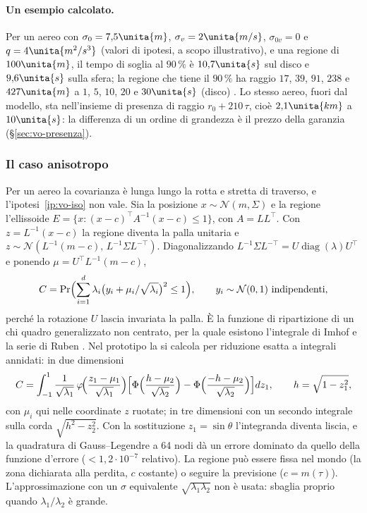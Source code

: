 \paragraph{Un esempio calcolato.} Per un aereo con $\sigma_0=7{,}5\unita{m}$, $\sigma_v=2\unita{m/s}$, $\sigma_{0v}=0$ e $q=4\unita{m^2/s^3}$ (valori di ipotesi, a scopo illustrativo), e una regione di $100\unita{m}$, il tempo di soglia al $90\,\%$ è $10{,}7\unita{s}$ sul disco e $9{,}6\unita{s}$ sulla sfera; la regione che tiene il $90\,\%$ ha raggio $17$, $39$, $91$, $238$ e $427\unita{m}$ a $1$, $5$, $10$, $20$ e $30\unita{s}$ (disco) . Lo stesso aereo, fuori dal modello, sta nell'insieme di presenza di raggio $r_0+210\,\tau$, cioè $2{,}1\unita{km}$ a $10\unita{s}$: la differenza di un ordine di grandezza è il prezzo della garanzia (\S\ref{sec:vo-presenza}).

\subsubsection{Il caso anisotropo}\label{sec:vo-c-aniso}

Per un aereo la covarianza è lunga lungo la rotta e stretta di traverso, e l'ipotesi~\ref{ip:vo-iso} non vale. Sia la posizione $x\sim\mathcal N(m,\Sigma)$ e la regione l'ellissoide $E=\{x:(x-c)^\top A^{-1}(x-c)\le1\}$, con $A=LL^\top$. Con $z=L^{-1}(x-c)$ la regione diventa la palla unitaria e $z\sim\mathcal N(L^{-1}(m-c),\,L^{-1}\Sigma L^{-\top})$. Diagonalizzando $L^{-1}\Sigma L^{-\top}=U\operatorname{diag}(\lambda)U^\top$ e ponendo $\mu=U^\top L^{-1}(m-c)$,
\begin{equation}\label{eq:vo-aniso}
C=\Pr\Bigl(\sum_{i=1}^d\lambda_i\bigl(y_i+\mu_i/\sqrt{\lambda_i}\bigr)^2\le1\Bigr),\qquad y_i\sim\mathcal N(0,1)\ \text{indipendenti},
\end{equation}
perché la rotazione $U$ lascia invariata la palla. È la funzione di ripartizione di un chi quadro generalizzato non centrato, per la quale esistono l'integrale di Imhof \citep{DA_VERIFICARE:imhof1961} e la serie di Ruben \citep{DA_VERIFICARE:ruben1962}. Nel prototipo la si calcola per riduzione esatta a integrali annidati: in due dimensioni
\[C=\int_{-1}^{1}\frac{1}{\sqrt{\lambda_1}}\,\varphi\!\Bigl(\frac{z_1-\mu_1}{\sqrt{\lambda_1}}\Bigr)\Bigl[\Phi\Bigl(\frac{h-\mu_2}{\sqrt{\lambda_2}}\Bigr)-\Phi\Bigl(\frac{-h-\mu_2}{\sqrt{\lambda_2}}\Bigr)\Bigr]dz_1,\qquad h=\sqrt{1-z_1^2},\]
con $\mu_i$ qui nelle coordinate $z$ ruotate; in tre dimensioni con un secondo integrale sulla corda $\sqrt{h^2-z_2^2}$. Con la sostituzione $z_1=\sin\theta$ l'integranda diventa liscia, e la quadratura di Gauss--Legendre a 64 nodi dà un errore dominato da quello della funzione d'errore ($<1{,}2\cdot10^{-7}$ relativo). La regione può essere fissa nel mondo (la zona dichiarata alla perdita, $c$ costante) o seguire la previsione ($c=m(\tau)$). L'approssimazione con un $\sigma$ equivalente $\sqrt{\lambda_1\lambda_2}$ non è usata: sbaglia proprio quando $\lambda_1/\lambda_2$ è grande.

